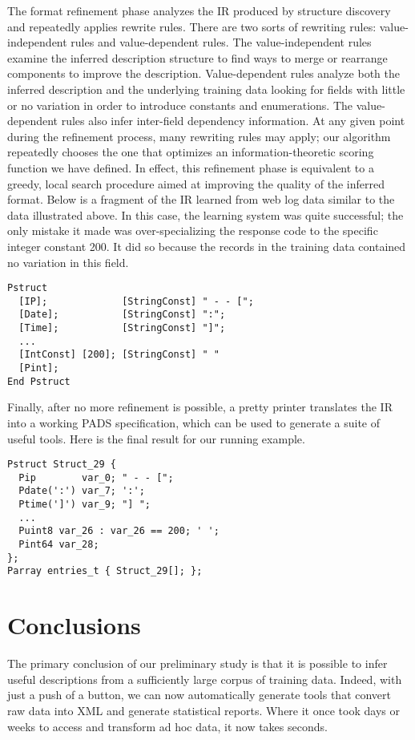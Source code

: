 \documentclass{sig-alternate-sigmod08}
\begin{document}
The format refinement phase analyzes the IR produced by structure discovery
and repeatedly applies 
rewrite rules.  There are two sorts of rewriting rules: 
value-independent rules and value-dependent rules.
The value-independent rules examine the inferred description structure
to find ways to merge or rearrange components to improve the description.
Value-dependent rules analyze both the inferred description and the underlying
training data looking for fields with little or no 
variation in order to introduce constants and enumerations.
The value-dependent rules also infer
inter-field dependency information.
At any given point during the refinement process,
many rewriting rules may apply; our algorithm repeatedly chooses the one 
that optimizes an information-theoretic
scoring function we have defined.
In effect, this refinement phase is equivalent to a greedy, local search
procedure aimed at improving the quality of the inferred format.
Below is a fragment of the IR learned from web log data similar to the data
illustrated above.  In this case, the learning system was quite successful;  the only mistake it
made was over-specializing the response code 
to the specific integer constant 200.  It did so because the 
records in the training data contained no variation in this field.

{\small
\begin{verbatim}
Pstruct
  [IP];             [StringConst] " - - [";
  [Date];           [StringConst] ":";
  [Time];           [StringConst] "]";
  ...
  [IntConst] [200]; [StringConst] " " 
  [Pint];
End Pstruct
\end{verbatim}
}
Finally, after no more refinement is possible, a pretty printer 
translates the IR into a working PADS 
specification,  which can be used to generate
a suite of useful tools.  Here is the final result for
our running example.

{\small
\begin{verbatim}
Pstruct Struct_29 {
  Pip        var_0; " - - [";
  Pdate(':') var_7; ':';
  Ptime(']') var_9; "] ";
  ...
  Puint8 var_26 : var_26 == 200; ' ';
  Pint64 var_28;
};
Parray entries_t { Struct_29[]; };
\end{verbatim}
}

\section*{Conclusions}
The primary conclusion of our preliminary study 
is that it is possible to infer useful \pads{} descriptions 
from a sufficiently large corpus of training data.  Indeed,
with just a push of a button, we can now automatically generate
tools that convert raw data into XML and generate statistical reports.
Where it once took days or weeks to access and transform ad hoc data, it now
takes seconds.
\end{document}
